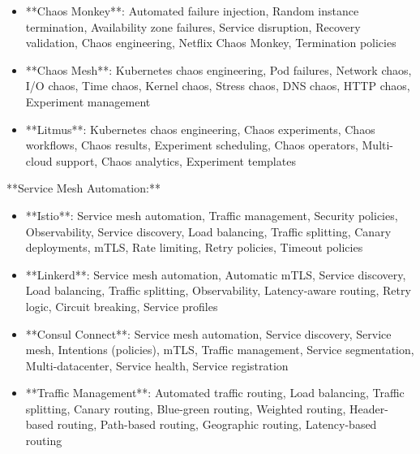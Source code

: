 \documentclass[11pt,a4paper]{article}
\begin{document}
\begin{itemize}
\item **Chaos Monkey**: Automated failure injection, Random instance termination, Availability zone failures, Service disruption, Recovery validation, Chaos engineering, Netflix Chaos Monkey, Termination policies
\end{itemize}

\begin{itemize}
\item **Chaos Mesh**: Kubernetes chaos engineering, Pod failures, Network chaos, I/O chaos, Time chaos, Kernel chaos, Stress chaos, DNS chaos, HTTP chaos, Experiment management
\end{itemize}

\begin{itemize}
\item **Litmus**: Kubernetes chaos engineering, Chaos experiments, Chaos workflows, Chaos results, Experiment scheduling, Chaos operators, Multi-cloud support, Chaos analytics, Experiment templates
\end{itemize}

**Service Mesh Automation:**

\begin{itemize}
\item **Istio**: Service mesh automation, Traffic management, Security policies, Observability, Service discovery, Load balancing, Traffic splitting, Canary deployments, mTLS, Rate limiting, Retry policies, Timeout policies
\end{itemize}

\begin{itemize}
\item **Linkerd**: Service mesh automation, Automatic mTLS, Service discovery, Load balancing, Traffic splitting, Observability, Latency-aware routing, Retry logic, Circuit breaking, Service profiles
\end{itemize}

\begin{itemize}
\item **Consul Connect**: Service mesh automation, Service discovery, Service mesh, Intentions (policies), mTLS, Traffic management, Service segmentation, Multi-datacenter, Service health, Service registration
\end{itemize}

\begin{itemize}
\item **Traffic Management**: Automated traffic routing, Load balancing, Traffic splitting, Canary routing, Blue-green routing, Weighted routing, Header-based routing, Path-based routing, Geographic routing, Latency-based routing
\end{itemize}
\end{document}
